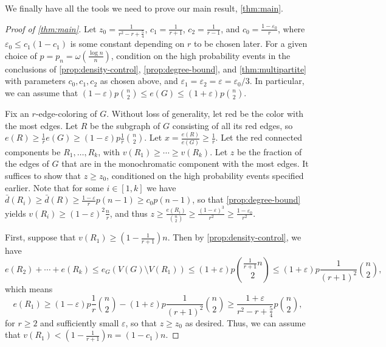 \documentclass[12pt]{amsart}
\theoremstyle{definition}
\numberwithin{equation}{section}
\begin{document}
We finally have all the tools we need to prove our main result, \cref{thm:main}.

\begin{proof}[Proof of \cref{thm:main}]
    Let $z_0=\frac{1}{r^2-r+\frac{5}{4}}$, $c_1=\frac{1}{r+1}$, $c_2=\frac{1}{r-1}$, and $c_0=\frac{1-\varepsilon_0}{r}$, where $\varepsilon_0\le c_1(1-c_1)$ is some constant depending on $r$ to be chosen later. 
    For a given choice of $p=p_n=\omega(\frac{\log n}{n})$, condition on the high probability events in the conclusions of \cref{prop:density-control}, \cref{prop:degree-bound}, and \cref{thm:multipartite} with parameters $c_0,c_1,c_2$ as chosen above, and $\varepsilon_1=\varepsilon_2=\varepsilon=\varepsilon_0/3$. 
    In particular, we can assume that $(1-\varepsilon)p\binom{n}{2}\le  e(G)\le (1+\varepsilon)p \binom{n}{2}$.
    
    Fix an $r$-edge-coloring of $G$. Without loss of generality, let red be the color with the most edges. Let $R$ be the subgraph of $G$ consisting of all its red edges, so $e(R)\ge \frac{1}{r}e(G)\ge (1-\varepsilon)p\frac{1}{r} \binom{n}{2}$. Let $x=\frac{e(R)}{e(G)}\ge \frac{1}{r}$. Let the red connected components be $R_1,\dots,R_k$, with $v(R_1)\ge \cdots \ge v(R_k)$. Let $z$ be the fraction of the edges of $G$ that are in the monochromatic component with the most edges. It suffices to show that $z\ge z_0$, conditioned on the high probability events specified earlier. Note that for some $i\in [1,k]$ we have $\bar d(R_i)\ge \bar d(R)\ge \frac{1-\varepsilon}{r}p(n-1)\ge c_0 p(n-1)$, so that \cref{prop:degree-bound} yields $v(R_i)\ge (1-\varepsilon)^2\frac{n}{r}$, and thus $z\ge \frac{e(R_i)}{\binom{n}{2}}\ge \frac{(1-\varepsilon)^3}{r^2}\ge \frac{1-\varepsilon_0}{r^2}$.
    
    First, suppose that $v(R_1)\ge (1-\frac{1}{r+1})n$. Then by \cref{prop:density-control}, we have
    \[
        e(R_2)+\cdots+e(R_k)\le e_G(V(G)\setminus V(R_1))\le (1+\varepsilon)p \binom{\frac{1}{r+1} n}{2}\le (1+\varepsilon) p \frac{1}{(r+1)^2} \binom{n}{2},
    \]
    which means
    \[
    e(R_1)\ge (1-\varepsilon)p\frac{1}{r} \binom{n}{2} - (1+\varepsilon) p \frac{1}{(r+1)^2} \binom{n}{2} \ge \frac{1+\varepsilon}{r^2-r+\frac{5}{4}}p\binom{n}{2},
    \]
    for $r\ge 2$ and sufficiently small $\varepsilon$, so that $z\ge z_0$ as desired. 
    Thus, we can assume that $v(R_1)< (1-\frac{1}{r+1})n=(1-c_1)n$. 


\end{proof}
\end{document}
